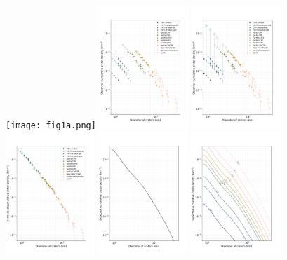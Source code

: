 \documentclass[preprint,12pt,3p,times,authoryear]{elsarticle}
\begin{document}
\begin{figure}[ht!]
    \centering
    \texttt{[image: fig1a.png]}
    \includegraphics[width=0.3\textwidth]{fig1b.png}
    \includegraphics[width=0.3\textwidth]{fig1_arrow.png}
    \includegraphics[width=0.3\textwidth]{fig1c.png}
    \includegraphics[width=0.3\textwidth]{fig1d.png}
    \includegraphics[width=0.3\textwidth]{fig1e.png}

\end{figure}
\end{document}
